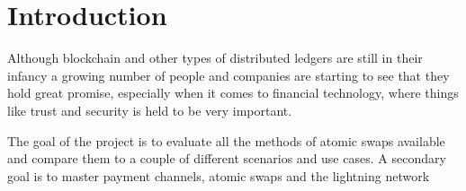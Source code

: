 
\chapter{Introduction}
Although blockchain and other types of distributed ledgers are still in their
infancy a growing number of people and companies are starting to see that they
hold great promise, especially when it comes to financial technology, where
things like trust and security is held to be very important.






The goal of the project is to evaluate all the methods of atomic swaps available
and compare them to a couple of different scenarios and use cases. A secondary
goal is to master payment channels, atomic swaps and the lightning network
